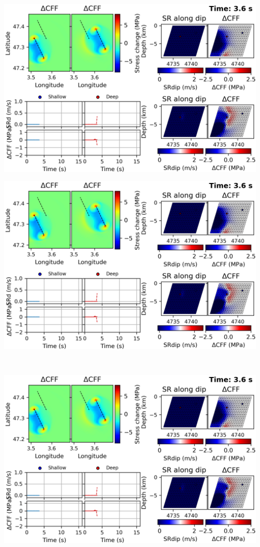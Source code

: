 \begin{poster}
{\begin{minipage}{0.48\linewidth}
 \includegraphics[width=0.94\linewidth]{images/horizontal_delta_00018_nofis.png}
\end{minipage} \vrule width 0.05cm
\begin{minipage}{0.48\linewidth}
\includegraphics[width=0.94\linewidth]{images/horizontal_delta_00018_nofis.png} 
\end{minipage}\\
\begin{minipage}{0.48\linewidth}
 \centering 
 \includegraphics[width=0.94\linewidth]{images/horizontal_delta_00018_nofis.png}
\end{minipage} \vrule width 0.05cm
\begin{minipage}{0.48\linewidth}
\end{minipage}

}
\end{poster}
